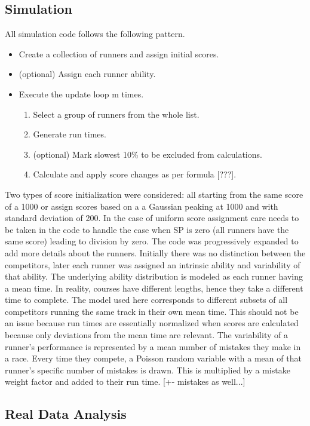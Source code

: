 \subsection{Simulation}
All simulation code follows the following pattern.
\begin{itemize}
\item Create a collection of runners and assign initial scores.
\item (optional) Assign each runner ability.
\item Execute the update loop m times.
	\begin{enumerate}
	\item Select a group of runners from the whole list.
	\item Generate run times.
	\item (optional) Mark slowest 10\% to be excluded from calculations.
	\item Calculate and apply score changes as per formula [???].
	\end{enumerate}
\end{itemize}

Two types of score initialization were considered: all starting from the same score of a 1000 or assign scores based on a a Gaussian peaking at 1000 and with standard deviation of 200. In the case of uniform score assignment care needs to be taken in the code to handle the case when SP is zero (all runners have the same score) leading to division by zero.
The code was progressively expanded to add more details about the runners. Initially there was no distinction between the competitors, later each runner was assigned an intrinsic ability and variability of that ability. The underlying ability distribution is modeled as each runner having a mean time. In reality, courses have different lengths, hence they take a different time to complete. The model used here corresponds to different subsets of all competitors running the same track in their own mean time. This should not be an issue because run times are essentially normalized when scores are calculated because only deviations from the mean time are relevant.
The variability of a runner's performance is represented by a mean number of mistakes they make in a race. Every time they compete, a Poisson random variable with a mean of that runner's specific number of mistakes is drawn. This is multiplied by a mistake weight factor and added to their run time. [+- mistakes as well...]

\subsection{Real Data Analysis}
